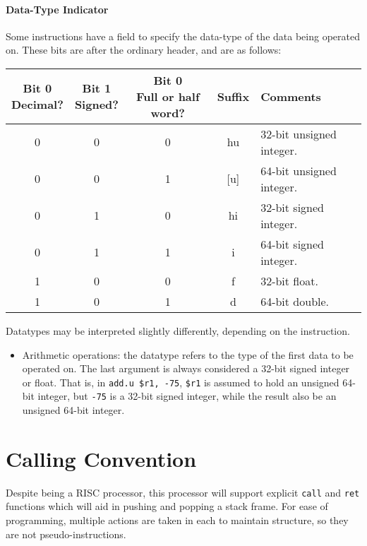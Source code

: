 \documentclass{article}
\begin{document}
\paragraph{Data-Type Indicator}
Some instructions have a field to specify the data-type of the data being operated on.
These bits are after the ordinary header, and are as follows:

\bigskip
\begin{tabular}{|c|c|c||c|l|}
    \hline
    \makecell[c]{\textbf{Bit 0}\\Decimal?} & \makecell[c]{\textbf{Bit 1}\\Signed?} & \makecell[c]{\textbf{Bit 0}\\Full or half word?} & \textbf{Suffix} & \textbf{Comments} \\
    \hline
    0 & 0 & 0 & hu & 32-bit unsigned integer. \\
    \hline
    0 & 0 & 1 & [u] & 64-bit unsigned integer. \\
    \hline
    0 & 1 & 0 & hi & 32-bit signed integer. \\
    \hline
    0 & 1 & 1 & i & 64-bit signed integer. \\
    \hline
    1 & 0 & 0 & f & 32-bit float. \\
    \hline
    1 & 0 & 1 & d & 64-bit double. \\
    \hline
\end{tabular}

\bigskip
Datatypes may be interpreted slightly differently, depending on the instruction.

\begin{itemize}
    \item Arithmetic operations: the datatype refers to the type of the first data to be operated on.
    The last argument is always considered a 32-bit signed integer or float.
    That is, in \texttt{add.u \$r1, -75}, \texttt{\$r1} is assumed to hold an unsigned 64-bit integer, but \texttt{-75} is a 32-bit signed integer, while the result also be an unsigned 64-bit integer.

\end{itemize}

\section{Calling Convention}

Despite being a RISC processor, this processor will support explicit \texttt{call} and \texttt{ret} functions which will aid in pushing and popping a stack frame.
For ease of programming, multiple actions are taken in each to maintain structure, so they are not pseudo-instructions.
\end{document}
